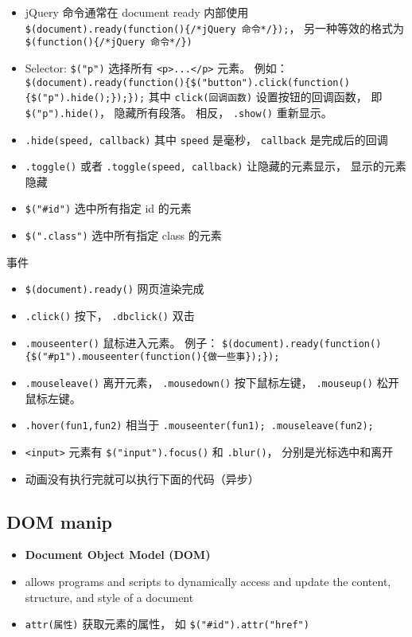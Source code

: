 
\begin{issues}
\issueDraft
\end{issues}


\begin{itemize}
\item jQuery 命令通常在 document ready 内部使用 \verb|$(document).ready(function(){/*jQuery 命令*/});|， 另一种等效的格式为 \verb|$(function(){/*jQuery 命令*/})|
\item Selector: \verb|$("p")| 选择所有 \verb|<p>...</p>| 元素。 例如： \verb|$(document).ready(function(){$("button").click(function(){$("p").hide();});});| 其中 \verb|click(回调函数)| 设置按钮的回调函数， 即 \verb|$("p").hide()|， 隐藏所有段落。 相反， \verb|.show()| 重新显示。
\item \verb|.hide(speed, callback)| 其中 \verb|speed| 是毫秒， \verb|callback| 是完成后的回调
\item \verb|.toggle()| 或者 \verb|.toggle(speed, callback)| 让隐藏的元素显示， 显示的元素隐藏
\item \verb|$("#id")| 选中所有指定 id 的元素
\item \verb|$(".class")| 选中所有指定 class 的元素
\end{itemize}

事件
\begin{itemize}
\item \verb|$(document).ready()| 网页渲染完成
\item \verb|.click()| 按下， \verb|.dbclick()| 双击
\item \verb|.mouseenter()| 鼠标进入元素。 例子： \verb|$(document).ready(function(){$("#p1").mouseenter(function(){做一些事});});|
\item \verb|.mouseleave()| 离开元素， \verb|.mousedown()| 按下鼠标左键， \verb|.mouseup()| 松开鼠标左键。
\item \verb|.hover(fun1,fun2)| 相当于 \verb|.mouseenter(fun1); .mouseleave(fun2);|
\item \verb|<input>| 元素有 \verb|$("input").focus()| 和 \verb|.blur()|， 分别是光标选中和离开
\item 动画没有执行完就可以执行下面的代码（异步）
\end{itemize}

\subsection{DOM manip}
\begin{itemize}
\item \textbf{Document Object Model (DOM)}
\item allows programs and scripts to dynamically access and update the content, structure, and style of a document
\item \verb|attr(属性)| 获取元素的属性， 如 \verb|$("#id").attr("href")|
\end{itemize}

